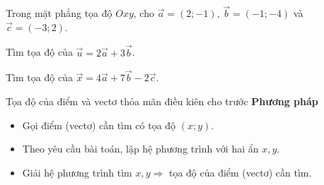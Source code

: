 \begin{vd}%
    Trong mặt phẳng tọa độ $Oxy$, cho $\overrightarrow{a}=(2;-1)$, $\overrightarrow{b}=(-1;-4)$ và $\overrightarrow{c}=(-3;2)$. 
    \begin{listEX}
        \item Tìm tọa độ của $\overrightarrow{u}=2\overrightarrow{a}+3\overrightarrow{b}$.
        \item Tìm tọa độ của $\overrightarrow{x}=4\overrightarrow{a}+7\overrightarrow{b}-2\overrightarrow{c}$.
    \end{listEX}
\end{vd}
\begin{dang}{Tọa độ của điểm và vectơ thỏa mãn điều kiên cho trước}
    \textbf{Phương pháp}
    \begin{itemize}
        \item Gọi điểm (vectơ) cần tìm có tọa độ $(x;y)$.
        \item Theo yêu cầu bài toán, lập hệ phương trình với hai ẩn $x,y$.
        \item Giải hệ phương trình tìm $x,y \Rightarrow$ tọa độ của điểm (vectơ) cần tìm.
    \end{itemize}
\end{dang}

